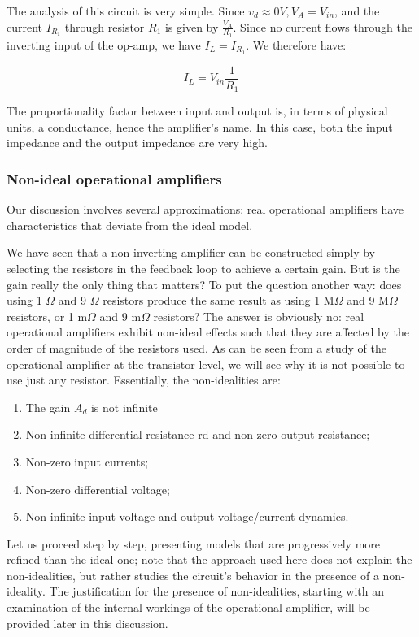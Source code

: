 \documentclass[../main.tex]{subfiles}
\begin{document}
The analysis of this circuit is very simple. Since $v_d \approx 0 V, V_A = V_{in}$, and the current $I_{R_1}$ through resistor $R_1$ is given by $\frac{V_A}{R_1}$. Since no current flows through the inverting input of the op-amp, we have $I_L = I_{R_1}$. We therefore have:

\begin{equation}
	I_L = V_{in} \frac{1}{R_1}
\end{equation}

The proportionality factor between input and output is, in terms of physical units, a conductance, hence the amplifier’s name. In this case, both the input impedance and the output impedance are very high.


\subsubsection{Non-ideal operational amplifiers}
\label{nonidopamp}

Our discussion involves several approximations: real operational amplifiers have characteristics that deviate from the ideal model.

We have seen that a non-inverting amplifier can be constructed simply by selecting the resistors in the feedback loop to achieve a certain gain. But is the gain really the only thing that matters? To put the question another way: does using 1 $\Omega$ and 9 $\Omega$ resistors produce the same result as using 1 M$\Omega$ and 9 M$\Omega$ resistors, or 1 m$\Omega$ and 9 m$\Omega$ resistors? The answer is obviously no: real operational amplifiers exhibit non-ideal effects such that they are affected by the order of magnitude of the resistors used.  As can be seen from a study of the operational amplifier at the transistor level, we will see why it is not possible to use just any resistor. Essentially, the non-idealities are:

\begin{enumerate}[label=\textbf{-}]
	\item The gain $A_d$ is not infinite
	\item Non-infinite differential resistance rd and non-zero output resistance;
	\item Non-zero input currents;
	\item Non-zero differential voltage;
	\item Non-infinite input voltage and output voltage/current dynamics.
\end{enumerate}


Let us proceed step by step, presenting models that are progressively more refined than the ideal one; note that the approach used here does not explain the non-idealities, but rather studies the circuit’s behavior in the presence of a non-ideality. 
The justification for the presence of non-idealities, starting with an examination of the internal workings of the operational amplifier, will be provided later in this discussion.
\end{document}
